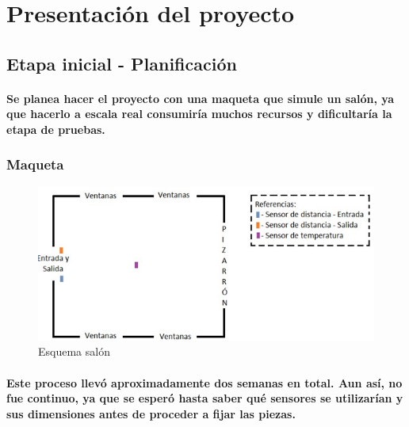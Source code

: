 \documentclass[12pt]{article} %
\newcommand{\normalparagraph}[1]{\paragraph{\textnormal{#1}}}
\begin{document}
\section{Presentación del proyecto} %



\subsection{Etapa inicial - Planificación} %
\normalparagraph {Se planea hacer el proyecto con una maqueta que simule un salón, ya que hacerlo a escala real consumiría muchos recursos y dificultaría la etapa de pruebas.}

\subsubsection{Maqueta} %



\begin{figure}[h!]
\centering
\includegraphics[width=0.79\linewidth]{Pictures/salon.jpeg}
\setcounter{subfigure}{2}%
\caption{Esquema salón}\label{fig:esquema}
\end{figure}

\normalparagraph {Este proceso llevó aproximadamente dos semanas en total. Aun así, no fue continuo, ya que se esperó hasta saber qué sensores se utilizarían y sus dimensiones antes de proceder a fijar las piezas.}
\end{document}

